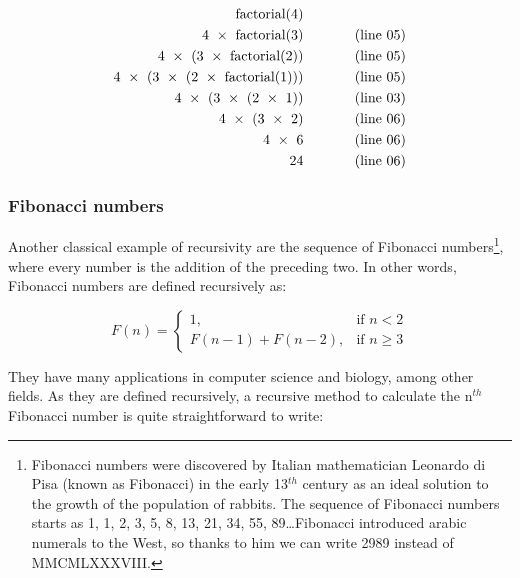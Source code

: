 \begin{equation*}
 \begin{aligned}
  \textrm{factorial(4)} & ~~~~~~~~~~~ \verb++\\
  \textrm{4 } \times \textrm{ factorial(3)} & ~~~~~~~~~~~ \textrm{(line 05)} \\
  \textrm{4 } \times \textrm{ (3 } \times \textrm{ factorial(2))} &  ~~~~~~~~~~~ \textrm{(line 05)} \\
  \textrm{4 } \times \textrm{ (3 } \times \textrm{ (2 } \times  \textrm{ factorial(1)))} & ~~~~~~~~~~~ \textrm{(line 05)}\\
  \textrm{4 } \times \textrm{ (3 } \times \textrm{ (2 } \times  \textrm{ 1))} & ~~~~~~~~~~~ \textrm{(line 03)}\\
  \textrm{4 } \times \textrm{ (3 } \times \textrm{ 2)} & ~~~~~~~~~~~ \textrm{(line 06)} \\
  \textrm{4 } \times \textrm{ 6} & ~~~~~~~~~~~ \textrm{(line 06)}\\
  \textrm{24} & ~~~~~~~~~~~ \textrm{(line 06)}\\
 \end{aligned}
\end{equation*}

\subsubsection{Fibonacci numbers}

Another classical example of recursivity are the sequence of Fibonacci
numbers\footnote{Fibonacci numbers were discovered by Italian mathematician
Leonardo di Pisa (known as Fibonacci) in the early 13$^{th}$ century
as an ideal solution to the growth of the population of rabbits. The
sequence of Fibonacci numbers starts as 1, 1, 2, 3, 5, 8, 13, 21, 34,
55, 89\ldots Fibonacci introduced arabic numerals to the West, so
thanks to him we can write 2989 instead of MMCMLXXXVIII.}, where every
number is the addition of the preceding two. 
In other words, Fibonacci numbers are defined recursively as:

$$ F(n) = 
  \begin{cases} 
    1,               & \mbox{if } n < 2 \\ 
    F(n-1) + F(n-2), & \mbox{if } n \ge 3
  \end{cases}
$$

They have many applications in computer science and biology, among
other fields. As they are defined recursively, a recursive method to
calculate the n$^{th}$ Fibonacci number is quite straightforward to
write: 

